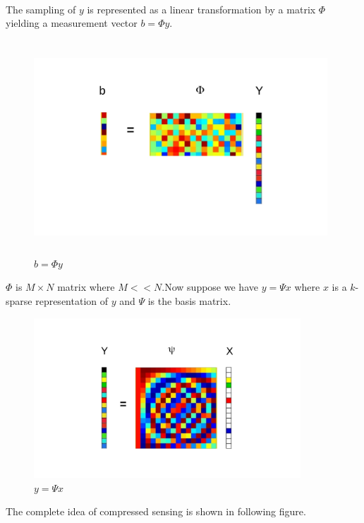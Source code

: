 \paragraph{}The sampling of $y$ is represented as a linear transformation
 by a matrix $\Phi$  yielding a measurement vector $b = \Phi y$. 
\begin{figure}[!htbp]
  \begin{center}
      \includegraphics[height = 8cm, width=11cm]{figures/1}
    \caption{$ b= \Phi y$}
    \label{Figci1}
  \end{center}
\end{figure}

$\Phi$ is $M \times N$ matrix where $M<<N$.Now suppose we have $y= \Psi x$ where $x$ is a $k$-sparse representation of 
$y$ and $\Psi$ is the basis matrix. 
\newpage
\begin{figure}[!htbp]
  \begin{center}
      \includegraphics[height = 6cm, width=10cm]{figures/2}
    \caption{$ y = \Psi x$ }
    \label{Figci2}
  \end{center}
\end{figure}
The complete idea of compressed sensing is shown in following figure.

